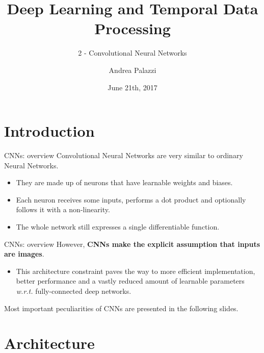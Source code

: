 \documentclass[aspectratio=169]{beamer}
\title[Deep Learning and Temporal Data Processing]{Deep Learning and Temporal Data Processing}
\subtitle{2 - Convolutional Neural Networks}
\institute{University of Modena and Reggio Emilia}
\author{Andrea Palazzi}
\date{June 21th, 2017}
\def\thisframelogos{}
\newcommand{\framelogo}[1]{\def\thisframelogos{#1}}
\begin{document}
\framelogo{img/template/logo_unimore_white.png}







\section{Introduction}


\begin{frame}{CNNs: overview}
Convolutional Neural Networks are very similar to ordinary Neural Networks.\\
\begin{itemize}
\item They are made up of neurons that have learnable weights and biases.
\item Each neuron receives some inputs, performs a dot product and optionally follows it with a non-linearity.
\item The whole network still expresses a single differentiable function.
\end{itemize}
\end{frame}


\begin{frame}{CNNs: overview}
However, \textbf{CNNs make the explicit assumption that inputs are images}.
\begin{itemize}
\item \large{This architecture constraint paves the way to more efficient implementation, better performance and a vastly reduced amount of learnable parameters \emph{w.r.t.} fully-connected deep networks.}
\end{itemize}
Most important peculiarities of CNNs are presented in the following slides.
\end{frame}




\section{Architecture}
\end{document}
